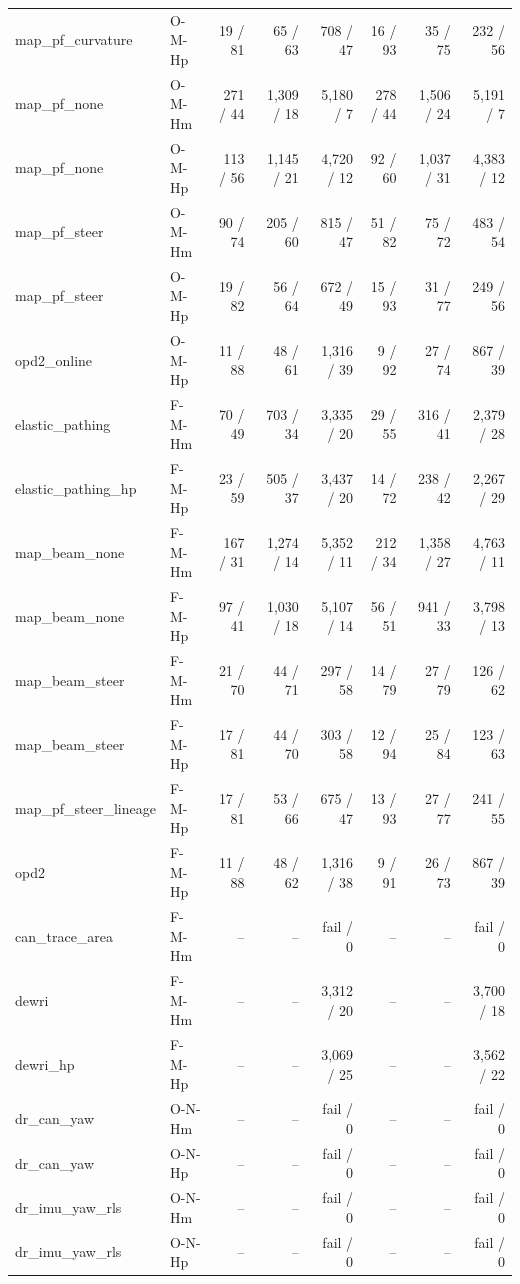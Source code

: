 \begin{table}[t]
\begin{tabular}{llrrrrrr}
map\_pf\_curvature & O-M-Hp & 19 / 81 & 65 / 63 & 708 / 47 & 16 / 93 & 35 / 75 & 232 / 56 \\
map\_pf\_none & O-M-Hm & 271 / 44 & 1{,}309 / 18 & 5{,}180 / 7 & 278 / 44 & 1{,}506 / 24 & 5{,}191 / 7 \\
map\_pf\_none & O-M-Hp & 113 / 56 & 1{,}145 / 21 & 4{,}720 / 12 & 92 / 60 & 1{,}037 / 31 & 4{,}383 / 12 \\
map\_pf\_steer & O-M-Hm & 90 / 74 & 205 / 60 & 815 / 47 & 51 / 82 & 75 / 72 & 483 / 54 \\
map\_pf\_steer & O-M-Hp & 19 / 82 & 56 / 64 & 672 / 49 & 15 / 93 & 31 / 77 & 249 / 56 \\
opd2\_online & O-M-Hp & 11 / 88 & 48 / 61 & 1{,}316 / 39 & 9 / 92 & 27 / 74 & 867 / 39 \\
elastic\_pathing & F-M-Hm & 70 / 49 & 703 / 34 & 3{,}335 / 20 & 29 / 55 & 316 / 41 & 2{,}379 / 28 \\
elastic\_pathing\_hp & F-M-Hp & 23 / 59 & 505 / 37 & 3{,}437 / 20 & 14 / 72 & 238 / 42 & 2{,}267 / 29 \\
map\_beam\_none & F-M-Hm & 167 / 31 & 1{,}274 / 14 & 5{,}352 / 11 & 212 / 34 & 1{,}358 / 27 & 4{,}763 / 11 \\
map\_beam\_none & F-M-Hp & 97 / 41 & 1{,}030 / 18 & 5{,}107 / 14 & 56 / 51 & 941 / 33 & 3{,}798 / 13 \\
map\_beam\_steer & F-M-Hm & 21 / 70 & 44 / 71 & 297 / 58 & 14 / 79 & 27 / 79 & 126 / 62 \\
map\_beam\_steer & F-M-Hp & 17 / 81 & 44 / 70 & 303 / 58 & 12 / 94 & 25 / 84 & 123 / 63 \\
map\_pf\_steer\_lineage & F-M-Hp & 17 / 81 & 53 / 66 & 675 / 47 & 13 / 93 & 27 / 77 & 241 / 55 \\
opd2 & F-M-Hp & 11 / 88 & 48 / 62 & 1{,}316 / 38 & 9 / 91 & 26 / 73 & 867 / 39 \\
can\_trace\_area & F-M-Hm & -- & -- & fail / 0 & -- & -- & fail / 0 \\
dewri & F-M-Hm & -- & -- & 3{,}312 / 20 & -- & -- & 3{,}700 / 18 \\
dewri\_hp & F-M-Hp & -- & -- & 3{,}069 / 25 & -- & -- & 3{,}562 / 22 \\
dr\_can\_yaw & O-N-Hm & -- & -- & fail / 0 & -- & -- & fail / 0 \\
dr\_can\_yaw & O-N-Hp & -- & -- & fail / 0 & -- & -- & fail / 0 \\
dr\_imu\_yaw\_rls & O-N-Hm & -- & -- & fail / 0 & -- & -- & fail / 0 \\
dr\_imu\_yaw\_rls & O-N-Hp & -- & -- & fail / 0 & -- & -- & fail / 0 \\

\end{tabular}
\end{table}
